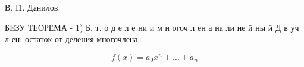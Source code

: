 \documentclass[10pt]{article}
\begin{document}
В. І1. Данилов.



БEЗУ ТЕОРЕМА - 1) Б. т. о д е л е ни и м н огоч л ен а на ли не й ны й Д в уч л ен: остаток от деления многочлена



\[

f(x)=a_{0} x^{n}+\ldots+a_{n}

\]
\end{document}
